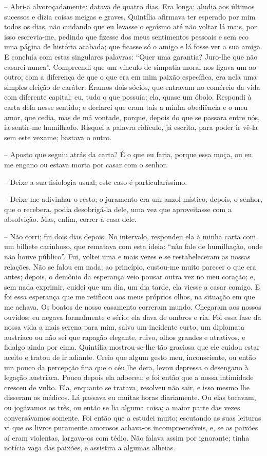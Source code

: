 -- Abri-a alvoroçadamente: datava de quatro dias. Era longa; aludia aos
últimos sucessos e dizia coisas meigas e graves. Quintília afirmava ter
esperado por mim todos os dias, não cuidando que eu levasse o egoísmo
até não voltar lá mais, por isso escrevia-me, pedindo que fizesse dos
meus sentimentos pessoais e sem eco uma página de história acabada; que
ficasse só o amigo e lá fosse ver a sua amiga. E concluía com estas
singulares palavras: ``Quer uma garantia? Juro-lhe que não casarei
nunca''. Compreendi que um vínculo de simpatia moral nos ligava um ao
outro; com a diferença de que o que era em mim paixão específica, era
nela uma simples eleição de caráter. Éramos dois sócios, que entravam no
comércio da vida com diferente capital: eu, tudo o que possuía; ela,
quase um óbolo. Respondi à carta dela nesse sentido; e declarei que eram
tais a minha obediência e o meu amor, que cedia, mas de má vontade,
porque, depois do que se passara entre nós, ia sentir-me humilhado.
Risquei a palavra ridículo, já escrita, para poder ir vê-la sem este
vexame; bastava o outro.

-- Aposto que seguiu atrás da carta? É o que eu faria, porque essa moça,
ou eu me engano ou estava morta por casar com o senhor.

-- Deixe a sua fisiologia usual; este caso é particularíssimo.

-- Deixe-me adivinhar o resto; o juramento era um anzol místico; depois,
o senhor, que o recebera, podia desobrigá-la dele, uma vez que
aproveitasse com a absolvição. Mas, enfim, correr à casa dele.

-- Não corri; fui dois dias depois. No intervalo, respondeu ela à minha
carta com um bilhete carinhoso, que rematava com esta ideia: ``não fale
de humilhação, onde não houve público''. Fui, voltei uma e mais vezes e
se restabeleceram as nossas relações. Não se falou em nada; ao
princípio, custou-me muito parecer o que era antes; depois, o demônio da
esperança veio pousar outra vez no meu coração; e, sem nada exprimir,
cuidei que um dia, um dia tarde, ela viesse a casar comigo. E foi essa
esperança que me retificou aos meus próprios olhos, na situação em que
me achava. Os boatos de nosso casamento correram mundo. Chegaram aos
nossos ouvidos; eu negava formalmente e sério; ela dava de ombros e ria.
Foi essa fase da nossa vida a mais serena para mim, salvo um incidente
curto, um diplomata austríaco ou não sei que rapagão elegante, ruivo,
olhos grandes e atrativos, e fidalgo ainda por cima. Quintília
mostrou-se-lhe tão graciosa que ele cuidou estar aceito e tratou de ir
adiante. Creio que algum gesto meu, inconsciente, ou então um pouco da
percepção fina que o céu lhe dera, levou depressa o desengano à legação
austríaca. Pouco depois ela adoeceu; e foi então que a nossa intimidade
cresceu de vulto. Ela, enquanto se tratava, resolveu não sair, e isso
mesmo lhe disseram os médicos. Lá passava eu muitas horas diariamente.
Ou elas tocavam, ou jogávamos os três, ou então se lia alguma coisa; a
maior parte das vezes conversávamos somente. Foi então que a estudei
muito; escutando as suas leituras vi que os livros puramente amorosos
achava-os incompreensíveis, e, se as paixões aí eram violentas,
largava-os com tédio. Não falava assim por ignorante; tinha notícia vaga
das paixões, e assistira a algumas alheias.

